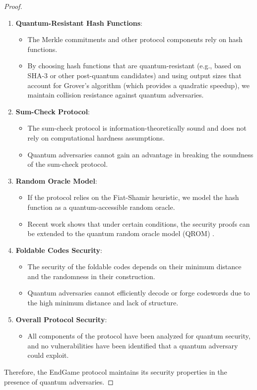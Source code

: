 \documentclass{article}
\theoremstyle{plain}
\theoremstyle{definition}
\theoremstyle{remark}
\theoremstyle{problem}
\begin{document}
\begin{proof}
\begin{enumerate}
    \item \textbf{Quantum-Resistant Hash Functions}:
    \begin{itemize}
        \item The Merkle commitments and other protocol components rely on hash functions.
        \item By choosing hash functions that are quantum-resistant (e.g., based on SHA-3 or other post-quantum candidates) and using output sizes that account for Grover's algorithm (which provides a quadratic speedup), we maintain collision resistance against quantum adversaries.
    \end{itemize}

    \item \textbf{Sum-Check Protocol}:
    \begin{itemize}
        \item The sum-check protocol is information-theoretically sound and does not rely on computational hardness assumptions.
        \item Quantum adversaries cannot gain an advantage in breaking the soundness of the sum-check protocol.
    \end{itemize}

    \item \textbf{Random Oracle Model}:
    \begin{itemize}
        \item If the protocol relies on the Fiat-Shamir heuristic, we model the hash function as a quantum-accessible random oracle.
        \item Recent work shows that under certain conditions, the security proofs can be extended to the quantum random oracle model (QROM) \cite{unruh2015non}.
    \end{itemize}

    \item \textbf{Foldable Codes Security}:
    \begin{itemize}
        \item The security of the foldable codes depends on their minimum distance and the randomness in their construction.
        \item Quantum adversaries cannot efficiently decode or forge codewords due to the high minimum distance and lack of structure.
    \end{itemize}

    \item \textbf{Overall Protocol Security}:
    \begin{itemize}
        \item All components of the protocol have been analyzed for quantum security, and no vulnerabilities have been identified that a quantum adversary could exploit.
    \end{itemize}
\end{enumerate}

Therefore, the EndGame protocol maintains its security properties in the presence of quantum adversaries.
\end{proof}
\end{document}
